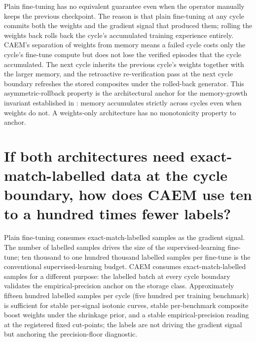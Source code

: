 Plain fine-tuning has no equivalent guarantee even when the operator manually keeps the previous checkpoint. The reason is that plain fine-tuning at any cycle commits both the weights and the gradient signal that produced them; rolling the weights back rolls back the cycle's accumulated training experience entirely. CAEM's separation of weights from memory means a failed cycle costs only the cycle's fine-tune compute but does not lose the verified episodes that the cycle accumulated. The next cycle inherits the previous cycle's weights together with the larger memory, and the retroactive re-verification pass at the next cycle boundary refreshes the stored composites under the rolled-back generator. This asymmetric-rollback property is the architectural anchor for the memory-growth invariant established in : memory accumulates strictly across cycles even when weights do not. A weights-only architecture has no monotonicity property to anchor.


\section[Sample efficiency]{If both architectures need exact-match-labelled data at the cycle boundary, how does CAEM use ten to a hundred times fewer labels?}
\label{app:qa-sample-efficiency}

Plain fine-tuning consumes exact-match-labelled samples as the gradient signal. The number of labelled samples drives the size of the supervised-learning fine-tune; ten thousand to one hundred thousand labelled samples per fine-tune is the conventional supervised-learning budget. CAEM consumes exact-match-labelled samples for a different purpose: the labelled batch at every cycle boundary validates the empirical-precision anchor on the storage class. Approximately fifteen hundred labelled samples per cycle (five hundred per training benchmark) is sufficient for stable per-signal isotonic curves, stable per-benchmark composite boost weights under the shrinkage prior, and a stable empirical-precision reading at the registered fixed cut-points; the labels are not driving the gradient signal but anchoring the precision-floor diagnostic.

